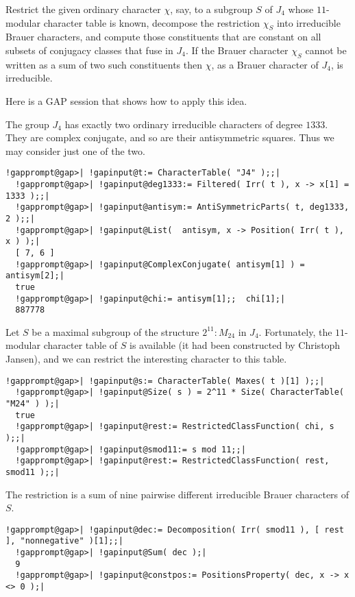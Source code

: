 \documentclass[a4paper,11pt]{report}
\begin{document}
{{{ Restrict the given ordinary character $\chi$, say, to a subgroup $S$ of $J_4$ whose $11$-modular character table is known, decompose the restriction $\chi_S$ into irreducible Brauer characters, and compute those constituents that are
constant on all subsets of conjugacy classes that fuse in $J_4$. If the Brauer character $\chi_S$ cannot be written as a sum of two such constituents then $\chi$, as a Brauer character of $J_4$, is irreducible. 

 Here is a \textsf{GAP} session that shows how to apply this idea. 

 The group $J_4$ has exactly two ordinary irreducible characters of degree $1333$. They are complex conjugate, and so are their antisymmetric squares. Thus we
may consider just one of the two. 

 
\begin{Verbatim}[commandchars=!@|,fontsize=\small,frame=single,label=Example]
  !gapprompt@gap>| !gapinput@t:= CharacterTable( "J4" );;|
  !gapprompt@gap>| !gapinput@deg1333:= Filtered( Irr( t ), x -> x[1] = 1333 );;|
  !gapprompt@gap>| !gapinput@antisym:= AntiSymmetricParts( t, deg1333, 2 );;|
  !gapprompt@gap>| !gapinput@List(  antisym, x -> Position( Irr( t ), x ) );|
  [ 7, 6 ]
  !gapprompt@gap>| !gapinput@ComplexConjugate( antisym[1] ) = antisym[2];|
  true
  !gapprompt@gap>| !gapinput@chi:= antisym[1];;  chi[1];|
  887778
\end{Verbatim}
 Let $S$ be a maximal subgroup of the structure $2^{11}:M_{24}$ in $J_4$. Fortunately, the $11$-modular character table of $S$ is available (it had been constructed by Christoph Jansen), and we can
restrict the interesting character to this table. 
\begin{Verbatim}[commandchars=!@|,fontsize=\small,frame=single,label=Example]
  !gapprompt@gap>| !gapinput@s:= CharacterTable( Maxes( t )[1] );;|
  !gapprompt@gap>| !gapinput@Size( s ) = 2^11 * Size( CharacterTable( "M24" ) );|
  true
  !gapprompt@gap>| !gapinput@rest:= RestrictedClassFunction( chi, s );;|
  !gapprompt@gap>| !gapinput@smod11:= s mod 11;;|
  !gapprompt@gap>| !gapinput@rest:= RestrictedClassFunction( rest, smod11 );;|
\end{Verbatim}
 The restriction is a sum of nine pairwise different irreducible Brauer
characters of $S$. 
\begin{Verbatim}[commandchars=!@|,fontsize=\small,frame=single,label=Example]
  !gapprompt@gap>| !gapinput@dec:= Decomposition( Irr( smod11 ), [ rest ], "nonnegative" )[1];;|
  !gapprompt@gap>| !gapinput@Sum( dec );|
  9
  !gapprompt@gap>| !gapinput@constpos:= PositionsProperty( dec, x -> x <> 0 );|

\end{Verbatim}}}}
\end{document}
